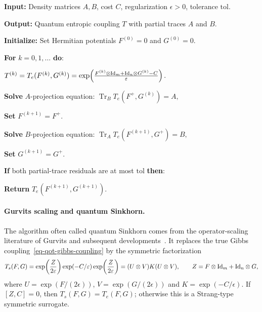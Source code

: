 \begin{alg}\label{alg:quantum-exact-bregman}
\textbf{Input:} Density matrices $A,B$, cost $C$, regularization $\epsilon>0$, tolerance $\mathrm{tol}$.

\textbf{Output:} Quantum entropic coupling $T$ with partial traces $A$ and $B$.

\textbf{Initialize:} Set Hermitian potentials $F^{(0)}=0$ and $G^{(0)}=0$.

\textbf{For} $k=0,1,\ldots$ \textbf{do}:
\begin{algblock}
\(T^{(k)}= T_e(F^{(k)},G^{(k)}) = \exp\!\left( \frac{F^{(k)}\otimes\mathrm{Id}_m+\mathrm{Id}_n\otimes G^{(k)}-C}{\varepsilon} \right).\)

\textbf{Solve} $A$-projection equation:
\(\operatorname{Tr}_B T_e(F^+,G^{(k)})=A,\)

\textbf{Set} $F^{(k+1)}=F^+$.

\textbf{Solve} $B$-projection equation:
\(\operatorname{Tr}_A T_e(F^{(k+1)},G^+)=B,\)

\textbf{Set} $G^{(k+1)}=G^+$.

\textbf{If} both partial-trace residuals are at most $\mathrm{tol}$ \textbf{then}:
\begin{algblock}
\textbf{Return} $T_e(F^{(k+1)},G^{(k+1)})$.
\end{algblock}
\end{algblock}
\end{alg}

\paragraph{Gurvits scaling and quantum Sinkhorn.}
The algorithm often called quantum Sinkhorn comes from the operator-scaling literature of Gurvits and subsequent developments~\cite{gurvits2003classical,gurvits2004classical,georgiou2015positive,garg2018recent}. It replaces the true Gibbs coupling~\eqref{eq-qot-gibbs-coupling} by the symmetric factorization
\begin{equation}\label{eq-qot-symmetric-scaling}
	T_s(F,G)
	=
	\exp\!\left(\frac{Z}{2\varepsilon}\right)\exp(-C/\varepsilon)\exp\!\left(\frac{Z}{2\varepsilon}\right)
	=
	(U\otimes V)K(U\otimes V),
	\qquad
	Z=F\otimes\mathrm{Id}_m+\mathrm{Id}_n\otimes G,
\end{equation}
where $U=\exp(F/(2\epsilon))$, $V=\exp(G/(2\epsilon))$ and $K=\exp(-C/\epsilon)$. If $[Z,C]=0$, then $T_s(F,G)=T_e(F,G)$; otherwise this is a Strang-type symmetric surrogate.


